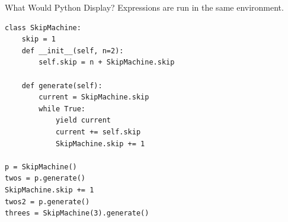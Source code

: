 
\begin{blocksection}
\question What Would Python Display? Expressions are run in the same environment.
\begin{lstlisting}
class SkipMachine:
    skip = 1
    def __init__(self, n=2):
        self.skip = n + SkipMachine.skip

    def generate(self):
        current = SkipMachine.skip
        while True:
            yield current
            current += self.skip
            SkipMachine.skip += 1

p = SkipMachine()
twos = p.generate()
SkipMachine.skip += 1
twos2 = p.generate()
threes = SkipMachine(3).generate()
\end{lstlisting}
\end{blocksection}

